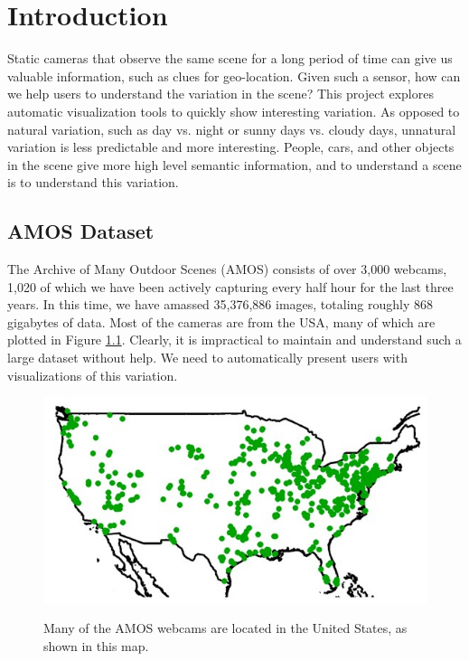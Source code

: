 \chapter{Introduction}
\label{cpt:intro}

Static cameras that observe the same scene for a long period of time can give us valuable information, such as clues for geo-location\cite{jacobs08geoorient}.  Given such a sensor, how can we help users to understand the variation in the scene?  This project explores automatic visualization tools to quickly show interesting variation.  As opposed to natural variation, such as day vs. night or sunny days vs. cloudy days, unnatural variation is less predictable and more interesting.  People, cars, and other objects in the scene give more high level semantic information, and to understand a scene is to understand this variation.


\section{AMOS Dataset}

The Archive of Many Outdoor Scenes (AMOS) consists of over 3,000 webcams, 1,020 of which we have been actively capturing every half hour for the last three years.  In this time, we have amassed 35,376,886 images, totaling roughly 868 gigabytes of data.  Most of the cameras are from the USA, many of which are plotted in Figure \ref{fig:localizationMap}.  Clearly, it is impractical to maintain and understand such a large dataset without help.  We need to automatically present users with visualizations of this variation.

\begin{figure}[ht]
\centering
\includegraphics[width = 1\textwidth]{figures/localizationMap.jpg}
\label{fig:localizationMap}
\caption[Map of known webcam locations from the AMOS dataset.]{Many of the AMOS webcams are located in the United States, as shown in this map.}
\end{figure}


